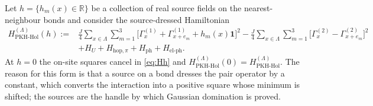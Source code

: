 \documentclass[11pt]{article}
\numberwithin{equation}{section}
\newcommand{\id}{\mathbf{1}}
\newcommand{\R}{\mathbb{R}}
\newcommand{\Lamb}{\Lambda}
\newcommand{\ph}{\mathrm{ph}}
\newcommand{\hop}{\mathrm{hop}}
\newcommand{\PKH}{\mathrm{PKH\text{-}Hol}}
\newcommand{\Gam}{\Gamma}
\theoremstyle{definition}
\begin{document}
Let $h=\{h_{m}(x)\in\R\}$ be a collection of real source fields on the nearest-neighbour
bonds and consider the source-dressed Hamiltonian
\begin{equation}
\begin{aligned}
H^{(\Lamb)}_{\PKH}(h):={}&\frac{J}{4}\sum_{x\in\Lamb}\sum_{m=1}^{3}
\Big[\Gam^{(1)}_{x}+\Gam^{(1)}_{x+e_{m}}+h_{m}(x)\id\Big]^{2}
-\frac{J}{4}\sum_{x\in\Lamb}\sum_{m=1}^{3}
\Big[\Gam^{(2)}_{x}-\Gam^{(2)}_{x+e_{m}}\Big]^{2}\\
&+H_{U}+H_{\hop,\pi}+H_{\ph}+H_{\text{el-ph}} .
\end{aligned}
\label{eq:Hh}
\end{equation}
At $h=0$ the on-site squares cancel in \eqref{eq:Hh} and $H^{(\Lamb)}_{\PKH}(0)=H^{(\Lamb)}_{\PKH}$.
The reason for this form is that a source on a bond dresses the pair operator by a
constant, which converts the interaction into a positive square whose minimum is shifted;
the sources are the handle by which Gaussian domination is proved.
\end{document}
